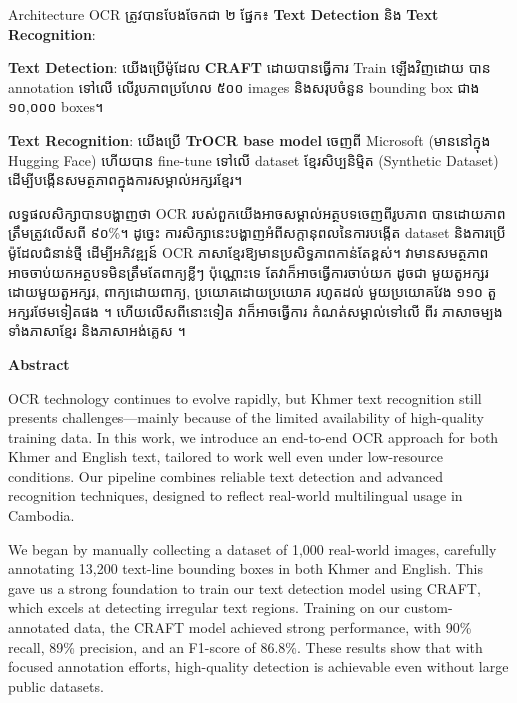 \begin{adjustwidth}{0.2cm}{0.2cm}
    Architecture OCR ត្រូវបានបែងចែកជា ២ ផ្នែក៖ \textbf{Text Detection} និង \textbf{Text Recognition}:\par
    
    \textbf{Text Detection}: យើងប្រើម៉ូដែល \textbf{CRAFT} ដោយបានធ្វើការ Train ឡើងវិញដោយ បាន annotation ទៅលើ 
    លើរូបភាពប្រហែល ៥០០ images និងសរុបចំនួន bounding box ជាង ១០,០០០ boxes។\par
    
    \textbf{Text Recognition}: យើងប្រើ \textbf{TrOCR base model} ចេញពី Microsoft (មាននៅក្នុង Hugging Face) ហើយបាន
    fine-tune ទៅលើ dataset ខ្មែរសិប្បនិម្មិត (Synthetic Dataset) ដើម្បីបង្កើនសមត្ថភាពក្នុងការសម្គាល់អក្សរខ្មែរ។\par
    
    លទ្ធផលសិក្សាបានបង្ហាញថា OCR របស់ពួកយើងអាចសម្គាល់អត្ថបទចេញពីរូបភាព បានដោយភាពត្រឹមត្រូវលើសពី ៩០\%។ 
    ដូច្នេះ ការសិក្សានេះបង្ហាញអំពីសក្តានុពលនៃការបង្កើត dataset និងការប្រើម៉ូដែលជំនាន់ថ្មី ដើម្បីអភិវឌ្ឍន៍ OCR ភាសាខ្មែរឱ្យមានប្រសិទ្ធភាពកាន់តែខ្ពស់។
    វាមានសមត្ថភាព អាចចាប់យកអត្ថបទមិនត្រឹមតែពាក្យខ្លីៗ ប៉ុណ្ណោះទេ តែវាក៏អាចធ្វើការចាប់យក ដូចជា មួយតួអក្សរដោយមួយតួអក្សរ, ពាក្យដោយពាក្យ, ប្រយោគដោយប្រយោគ រហូតដល់ មួយប្រយោគវែង ១១០ តួអក្សរថែមទៀតផង ។ ហើយលើសពីនោះទៀត វាក៏អាចធ្វើការ កំណត់សម្គាល់ទៅលើ ពីរ ភាសាចម្បង ទាំងភាសាខ្មែរ និងភាសាអង់គ្លេស ។    
    \vspace{2cm}
    
    \begin{center}
        {\bfseries\LARGE Abstract \par}
    \end{center}
    \label{abstract}
    \vspace{0.5cm}
    \englishfont
    \large
    
    OCR technology continues to evolve rapidly, but Khmer text 
    recognition still presents challenges—mainly because of the 
    limited availability of high-quality training data. In this work, 
    we introduce an end-to-end OCR approach for both Khmer and English text, 
    tailored to work well even under low-resource conditions. Our pipeline combines 
    reliable text detection and advanced recognition techniques, designed to reflect real-world multilingual usage in Cambodia.

    We began by manually collecting a dataset of 1,000 real-world images, 
    carefully annotating 13,200 text-line bounding boxes in both Khmer and English. 
    This gave us a strong foundation to train our text detection model using CRAFT, 
    which excels at detecting irregular text regions. Training on our custom-annotated 
    data, the CRAFT model achieved strong performance, with 90\% recall, 89\% precision, 
    and an F1-score of 86.8\%. These results show that with focused annotation efforts, 
    high-quality detection is achievable even without large public datasets.
    

\end{adjustwidth}
